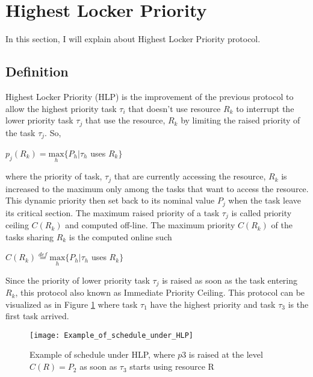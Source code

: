 \section{Highest Locker Priority}
In this section, I will explain about Highest Locker Priority protocol.

\subsection{Definition}

Highest Locker Priority (HLP) is the improvement of the previous protocol to allow the highest priority task $\tau_{i}$ that doesn't use resource $R_{k}$ to interrupt the lower priority task $\tau_{j}$ that use the resource, $R_{k}$ by limiting the raised priority of the task $\tau_{j}$. So, 
 
\begin{center}
 $p_{j}(R_{k})=\underset{h}{\mathrm{max}} \{P_{h}| \tau_{h}$ uses $R_{k}\}  $ \cite{b5}
\end{center}

where the priority of task, $\tau_{j}$ that are currently accessing the resource, $R_{k}$ is increased to the maximum only among the tasks that want to access the resource. This dynamic priority then set back to its nominal value $P_{j}$ when the task leave its critical section. The maximum raised priority of a task $\tau_{j}$ is called priority ceiling $ C(R_{k}) $ and computed off-line.  The maximum priority $ C(R_{k}) $ of the tasks sharing $ R_{k} $ is the computed online such

\begin{center}
$C(R_{k})\stackrel{def}{=}\underset{h}{\mathrm{max}} \{P_{h}| \tau_{h}$ uses $R_{k}\}  $ \cite{b5}
\end{center}

Since the priority of lower priority task $\tau_{j}$ is raised as soon as the task entering $ R_{k} $, this protocol also known as Immediate Priority Ceiling. This protocol can be visualized as in Figure \ref{fig:Example_of_schedule_under_HLP} where task $ \tau_{1} $ have the highest priority and task $ \tau_{3} $ is the first task arrived.

\begin{figure}[ht]
    \centering
    \texttt{[image: Example\_of\_schedule\_under\_HLP]}
    \caption{ Example of schedule under HLP, where $ p3 $ is raised at the level $ C(R) = P_{2} $ as soon as $ \tau_{3} $ starts using resource R \cite{b5}}
    \label{fig:Example_of_schedule_under_HLP}
\end{figure}

